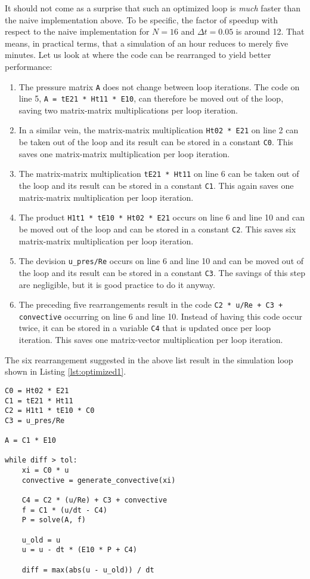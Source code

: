 It should not come as a surprise that such an optimized loop is \emph{much} faster than the naive implementation above. To be specific, the factor of speedup with respect to the naive implementation for $N = 16$ and $\Delta t = 0.05$ is around 12. That means, in practical terms, that a simulation of an hour reduces to merely five minutes. Let us look at where the code can be rearranged to yield better performance:
\begin{enumerate}
    \item The pressure matrix \lstinline|A| does not change between loop iterations. The code on line 5, \lstinline|A = tE21 * Ht11 * E10|, can therefore be moved out of the loop, saving two matrix-matrix multiplications per loop iteration.
    \item In a similar vein, the matrix-matrix multiplication \lstinline|Ht02 * E21| on line 2 can be taken out of the loop and its result can be stored in a constant \lstinline|C0|. This saves one matrix-matrix multiplication per loop iteration.
    \item The matrix-matrix multiplication \lstinline|tE21 * Ht11| on line 6 can be taken out of the loop and its result can be stored in a constant \lstinline|C1|. This again saves one matrix-matrix multiplication per loop iteration.
    \item The product \lstinline|H1t1 * tE10 * Ht02 * E21| occurs on line 6 and line 10 and can be moved out of the loop and can be stored in a constant \lstinline|C2|. This saves six matrix-matrix multiplication per loop iteration.
    \item The devision \lstinline|u_pres/Re| occurs on line 6 and line 10 and can be moved out of the loop and its result can be stored in a constant \lstinline|C3|. The savings of this step are negligible, but it is good practice to do it anyway.
    \item The preceding five rearrangements result in the code \lstinline|C2 * u/Re + C3 + convective| occurring on line 6 and line 10. Instead of having this code occur twice, it can be stored in a variable \lstinline|C4| that is updated once per loop iteration. This saves one matrix-vector multiplication per loop iteration.
\end{enumerate}

The six rearrangement suggested in the above list result in the simulation loop shown in Listing \ref{lst:optimized1}.

\begin{lstlisting}[caption=Code excerpt rearranged for improved performance., label=lst:optimized1]
C0 = Ht02 * E21
C1 = tE21 * Ht11
C2 = H1t1 * tE10 * C0
C3 = u_pres/Re

A = C1 * E10

while diff > tol:
    xi = C0 * u
    convective = generate_convective(xi)
    
    C4 = C2 * (u/Re) + C3 + convective
    f = C1 * (u/dt - C4)
    P = solve(A, f)
    
    u_old = u
    u = u - dt * (E10 * P + C4)
    
    diff = max(abs(u - u_old)) / dt
\end{lstlisting}


